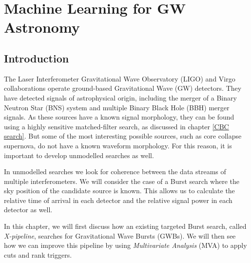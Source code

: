 \documentclass[11pt]{cuthesis}
\begin{document}
\chapter{Machine Learning for GW Astronomy} \label{chap: mva}
\section{\label{MLintro}Introduction}
The Laser Interferometer Gravitational Wave Observatory (LIGO) and Virgo collaborations operate ground-based Gravitational Wave (GW) detectors. They have detected signals of astrophysical origin, including the merger of a Binary Neutron Star (BNS) system and multiple Binary Black Hole (BBH) merger signals. As these sources have a known signal morphology, they can be found using a highly sensitive matched-filter search, as discussed in chapter \ref{CBC search}. But some of the most interesting possible sources, such as core collapse supernova, do not have a known waveform morphology. For this reason, it is important to develop unmodelled searches as well. 

In unmodelled searches we look for coherence between the data streams of multiple interferometers. We will consider the case of a Burst search where the sky position of the candidate source is known. This allows us to calculate the relative time of arrival in each detector and the relative signal power in each detector as well. 


In this chapter, we will first discuss how an existing targeted Burst search, called \textit{X-pipeline}, searches for Gravitational Wave Bursts (GWBs). We will then see how we can improve this pipeline by using \textit{Multivariate Analysis} (MVA) to apply cuts and rank triggers.  
\end{document}
